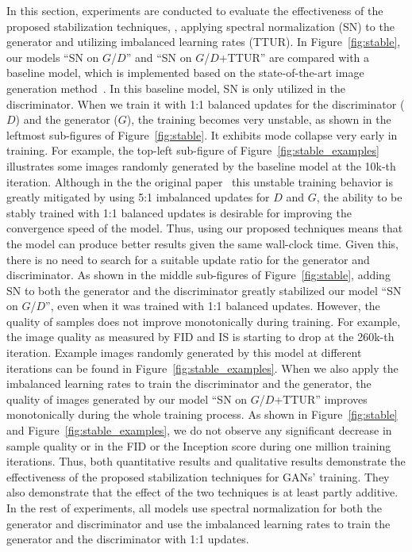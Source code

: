 \documentclass{article}
\begin{document}
In this section, experiments are conducted to evaluate the effectiveness of the proposed stabilization techniques, \ie, applying spectral normalization (SN) to the generator and utilizing imbalanced learning rates (TTUR). In Figure~\ref{fig:stable}, our models ``SN on $G$/$D$'' and ``SN on $G$/$D$+TTUR'' are compared with a baseline model, which is implemented based on the state-of-the-art image generation method~\cite{Miyato18a}. In this baseline model, SN is only utilized in the discriminator. When we train it with 1:1 balanced updates for the discriminator ($D$) and the generator ($G$), the training becomes very unstable, as shown in the leftmost sub-figures of Figure~\ref{fig:stable}. It exhibits mode collapse very early in training. For example, the top-left sub-figure of Figure~\ref{fig:stable_examples} illustrates some images randomly generated by the baseline model at the 10k-th iteration. Although in the the original paper~\cite{Miyato18a} this unstable training behavior is greatly mitigated by using 5:1 imbalanced updates for $D$ and $G$, the ability to be stably trained with 1:1 balanced updates is desirable for improving the convergence speed of the model. Thus, using our proposed techniques means that the model can produce better results given the same wall-clock time. Given this, there is no need to search for a suitable update ratio for the generator and discriminator. As shown in the middle sub-figures of Figure~\ref{fig:stable}, adding SN to both the generator and the discriminator greatly stabilized our model ``SN on $G$/$D$'', even when it was trained with 1:1 balanced updates. However, the quality of samples does not improve monotonically during training. For example, the image quality as measured by FID and IS is starting to drop at the 260k-th iteration. Example images randomly generated by this model at different iterations can be found in Figure~\ref{fig:stable_examples}. When we also apply the imbalanced learning rates to train the discriminator and the generator, the quality of images generated by our model ``SN on $G$/$D$+TTUR'' improves monotonically during the whole training process. As shown in Figure~\ref{fig:stable} and Figure~\ref{fig:stable_examples}, we do not observe any significant decrease in sample quality or in the FID or the Inception score during one million training iterations. Thus, both quantitative results and qualitative results demonstrate the effectiveness of the proposed stabilization techniques for GANs' training. They also demonstrate that the effect of the two techniques is at least partly additive. In the rest of experiments, all models use spectral normalization for both the generator and discriminator and use the imbalanced learning rates to train the generator and the discriminator with 1:1 updates.
\end{document}
